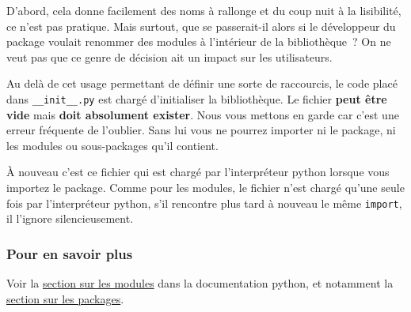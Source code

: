 D'abord, cela donne facilement des noms à rallonge et du coup nuit à la
lisibilité, ce n'est pas pratique. Mais surtout, que se passerait-il
alors si le développeur du package voulait renommer des modules à
l'intérieur de la bibliothèque~? On ne veut pas que ce genre de décision
ait un impact sur les utilisateurs.

    Au delà de cet usage permettant de définir une sorte de raccourcis, le
code placé dans \texttt{\_\_init\_\_.py} est chargé d'initialiser la
bibliothèque. Le fichier \textbf{peut être vide} mais \textbf{doit
absolument exister}. Nous vous mettons en garde car c'est une erreur
fréquente de l'oublier. Sans lui vous ne pourrez importer ni le package,
ni les modules ou sous-packages qu'il contient.

    À nouveau c'est ce fichier qui est chargé par l'interpréteur python
lorsque vous importez le package. Comme pour les modules, le fichier
n'est chargé qu'une seule fois par l'interpréteur python, s'il rencontre
plus tard à nouveau le même \texttt{import}, il l'ignore
silencieusement.

    \hypertarget{pour-en-savoir-plus}{%
\subsubsection{Pour en savoir plus}\label{pour-en-savoir-plus}}

    Voir la \href{https://docs.python.org/3/tutorial/modules.html}{section
sur les modules} dans la documentation python, et notamment la
\href{https://docs.python.org/3/tutorial/modules.html\#packages}{section
sur les packages}.


    
    
    
